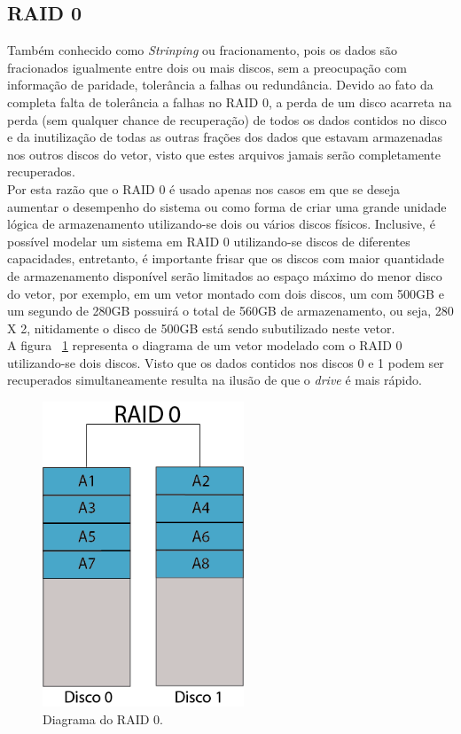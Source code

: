 		\subsection{RAID 0}
		
		Também conhecido como \textit{Strinping} ou fracionamento, pois os dados são fracionados igualmente entre dois ou mais discos, sem a preocupação com informação de paridade, tolerância a falhas ou redundância. Devido ao fato da completa falta de tolerância a falhas no RAID 0, a perda de um disco acarreta na perda (sem qualquer chance de recuperação) de todos os dados contidos no disco e da inutilização de todas as outras frações dos dados que estavam armazenadas nos outros discos do vetor, visto que estes arquivos jamais serão completamente recuperados.
		\\
		
		Por esta razão que o RAID 0 é usado apenas nos casos em que se deseja aumentar o desempenho do sistema ou como forma de criar uma grande unidade lógica de armazenamento utilizando-se dois ou vários discos físicos. Inclusive, é possível modelar um sistema em RAID 0 utilizando-se discos de diferentes capacidades, entretanto, é importante frisar que os discos com maior quantidade de armazenamento disponível serão limitados ao espaço máximo do menor disco do vetor, por exemplo, em um vetor montado com dois discos, um com 500GB e um segundo de 280GB possuirá o total de 560GB de armazenamento, ou seja, 280 X 2, nitidamente o disco de 500GB está sendo subutilizado neste vetor. \\
		
		A figura ~\ref{fig:raid0} representa o diagrama de um vetor modelado com o RAID 0 utilizando-se dois discos. Visto que os dados contidos nos discos 0 e 1 podem ser recuperados simultaneamente resulta na ilusão de que o \textit{drive} é mais rápido.\\
		
		\begin{figure}[htb]
			\begin{center}
				
				\includegraphics[clip,width=6.0cm]{images/RAID_0.png}
				\caption{Diagrama do RAID 0. }
				\label{fig:raid0}
			\end{center}
		\end{figure} 
		
